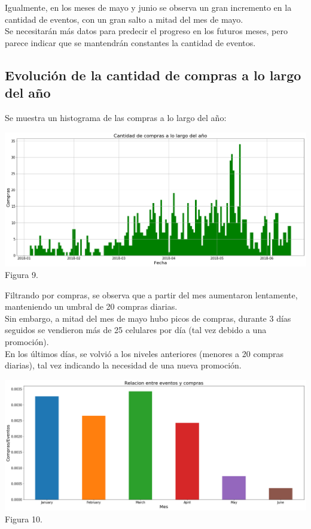 \documentclass[a4paper ,12pt]{article}
\begin{document}
 Igualmente, en los meses de mayo y junio se observa un gran incremento en la cantidad de eventos, con un gran salto a mitad del mes de mayo.\\
 
  Se necesitarán más datos para predecir el progreso en los futuros meses, pero parece indicar que se mantendrán constantes la cantidad de eventos.

\newpage  
\subsection{ Evolución de la cantidad de compras a lo largo del año}

Se muestra un histograma de las compras a lo largo del año:

\begin{center}
	\includegraphics[width=1.1\linewidth]{output_37_1}
	Figura 9.
	
\end{center}

Filtrando por compras, se observa que a partir del mes aumentaron lentamente, manteniendo un umbral de 20 compras diarias.\\

 Sin embargo, a mitad del mes de mayo hubo picos de compras, durante 3 días seguidos se vendieron más de 25 celulares por día (tal vez debido a una promoción). \\
 
 En los últimos días, se volvió a los niveles anteriores (menores a 20 compras diarias), tal vez indicando la necesidad de una nueva promoción.\\

\begin{center}
	\includegraphics[width=1.1\linewidth]{output_39_1}
	Figura 10.
	
\end{center}
\end{document}
